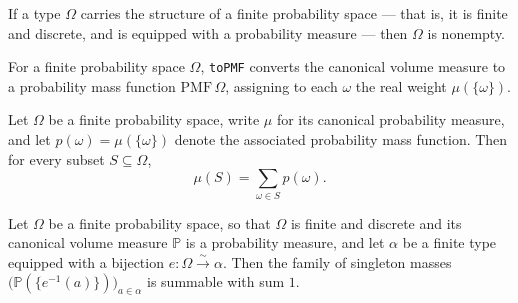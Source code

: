 \begin{theorem}
\label{CommunicationComplexity.FiniteProbabilitySpace.nonempty}
\leanok
{}
If a type $\Omega$ carries the structure of a finite probability space — that is, it is
finite and discrete, and is equipped with a probability measure — then $\Omega$ is
nonempty.
\end{theorem}

\begin{definition}
\label{CommunicationComplexity.FiniteProbabilitySpace.toPMF}
\leanok
{}
For a finite probability space $\Omega$, \texttt{toPMF} converts the canonical volume
measure to a probability mass function $\mathrm{PMF}\,\Omega$, assigning to each
$\omega$ the real weight $\mu(\{\omega\})$.
\end{definition}

\begin{theorem}
\label{CommunicationComplexity.FiniteProbabilitySpace.measure_eq}
\leanok
{}
Let $\Omega$ be a finite probability space, write $\mu$ for its canonical probability
measure, and let $p(\omega) = \mu(\{\omega\})$ denote the associated probability mass
function. Then for every subset $S \subseteq \Omega$,
\[
\mu(S) = \sum_{\omega \in S} p(\omega).
\]
\end{theorem}

\begin{theorem}
\label{CommunicationComplexity.FiniteProbabilitySpace.hasSum_measure_singletons}
\leanok
{}
Let $\Omega$ be a finite probability space, so that $\Omega$ is finite and discrete and
its canonical volume measure $\mathbb{P}$ is a probability measure, and let $\alpha$ be
a finite type equipped with a bijection $e : \Omega \xrightarrow{\sim} \alpha$. Then the
family of singleton masses $\bigl(\mathbb{P}(\{e^{-1}(a)\})\bigr)_{a \in \alpha}$ is
summable with sum $1$.
\end{theorem}

